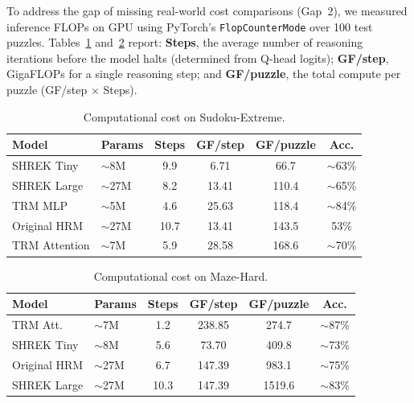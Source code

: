 To address the gap of missing real-world cost comparisons (Gap~2), we measured inference FLOPs on GPU using PyTorch's \texttt{FlopCounterMode} over 100 test puzzles. Tables~\ref{tab:flops_sudoku} and~\ref{tab:flops_maze} report: \textbf{Steps}, the average number of reasoning iterations before the model halts (determined from Q-head logits); \textbf{GF/step}, GigaFLOPs for a single reasoning step; and \textbf{GF/puzzle}, the total compute per puzzle (GF/step $\times$ Steps).

\begin{table}[htbp]
    \centering
    \caption{Computational cost on Sudoku-Extreme.}
    \label{tab:flops_sudoku}
    \begin{tabular}{llcccc}
        \toprule
        \textbf{Model} & \textbf{Params} & \textbf{Steps} & \textbf{GF/step} & \textbf{GF/puzzle} & \textbf{Acc.} \\
        \midrule
        SHREK Tiny     & $\sim$8M       & 9.9            & 6.71             & 66.7               & $\sim$63\%    \\
        SHREK Large    & $\sim$27M       & 8.2            & 13.41            & 110.4              & $\sim$65\%    \\
        TRM MLP        & $\sim$5M        & 4.6            & 25.63            & 118.4              & $\sim$84\%    \\
        Original HRM   & $\sim$27M       & 10.7           & 13.41            & 143.5              & 53\%          \\
        TRM Attention  & $\sim$7M        & 5.9            & 28.58            & 168.6              & $\sim$70\%    \\
        \bottomrule
    \end{tabular}
\end{table}

\begin{table}[htbp]
    \centering
    \caption{Computational cost on Maze-Hard.}
    \label{tab:flops_maze}
    \begin{tabular}{llcccc}
        \toprule
        \textbf{Model} & \textbf{Params} & \textbf{Steps} & \textbf{GF/step} & \textbf{GF/puzzle} & \textbf{Acc.} \\
        \midrule
        TRM Att.       & $\sim$7M        & 1.2            & 238.85           & 274.7              & $\sim$87\%    \\
        SHREK Tiny     & $\sim$8M       & 5.6            & 73.70            & 409.8              & $\sim$73\%    \\
        Original HRM   & $\sim$27M       & 6.7            & 147.39           & 983.1              & $\sim$75\%    \\
        SHREK Large    & $\sim$27M       & 10.3           & 147.39           & 1519.6             & $\sim$83\%    \\
        \bottomrule
    \end{tabular}
\end{table}

